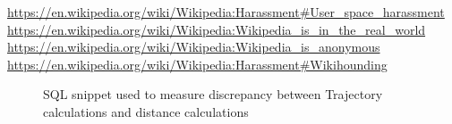 \url{https://en.wikipedia.org/wiki/Wikipedia:Harassment#User_space_harassment}
\url{https://en.wikipedia.org/wiki/Wikipedia:Wikipedia_is_in_the_real_world}
\url{https://en.wikipedia.org/wiki/Wikipedia:Wikipedia_is_anonymous}
\url{https://en.wikipedia.org/wiki/Wikipedia:Harassment#Wikihounding}

\begin{figure}
  \begin{subfigure}[t]{0.45\linewidth}
    
  \end{subfigure}
  \begin{subfigure}[t]{0.45\linewidth}
    
  \end{subfigure}
  \caption{SQL snippet used to measure discrepancy between Trajectory
    calculations and distance calculations}
\end{figure}
